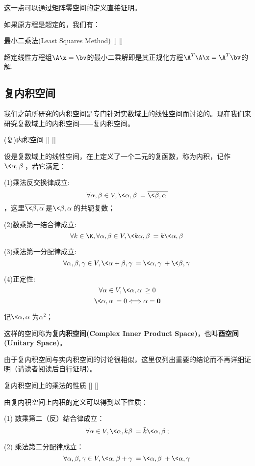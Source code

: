\documentclass[UTF8]{ctexart}
\begin{document}
		\begin{prf}
			这一点可以通过矩阵零空间的定义直接证明。
		\end{prf}
		
		如果原方程是超定的，我们有：
				
		\begin{thm}
			[]
			{最小二乘法(Least Squares Method)}
			[]
			[]
			
			超定线性方程组$\A\x=\bv$的最小二乘解即是其正规化方程$\A^T\A\x=\A^T\bv$的解. 
		\end{thm}

	\subsection{复内积空间}

		我们之前所研究的内积空间是专门针对实数域上的线性空间而讨论的。现在我们来研究复数域上的内积空间——复内积空间。

		\begin{dfn}
			[]
			{(复)内积空间}
			[]
			[]

			设是复数域上的线性空间，在上定义了一个二元的复函数，称为内积，记作$\<\alpha,\beta\>$，若它满足：

			(1)乘法反交换律成立: 
			\[\forall\alpha,\beta\in V, \<\alpha,\beta\>=\overline{\<\beta,\alpha\>} \]，这里\(\overline{\<\beta,\alpha\>}\)是\(\<\beta,\alpha\>\)的共轭复数；
			
			(2)数乘第一结合律成立: 
			\[\forall k\in\K, \forall \alpha,\beta\in V, \<k\alpha,\beta\>=k\<\alpha,\beta\>\]
			
			(3)乘法第一分配律成立: 
			\[\forall\alpha,\beta,\gamma\in V, \<\alpha+\beta,\gamma\>=\<\alpha,\gamma\>+\<\beta,\gamma\>\]
			
			(4)正定性: 
			\[\forall \alpha\in V, \<\alpha,\alpha\>\geq 0\]
			\[\<\alpha,\alpha\>=0\Longleftrightarrow \alpha=\mathbf{0}\]
			
			记$\<\alpha,\alpha\>$为$\alpha^2$； 

			这样的空间称为\textbf{复内积空间(Complex Inner Product Space)}，也叫\textbf{酉空间(Unitary Space)}。
		\end{dfn}

		由于复内积空间与实内积空间的讨论很相似，这里仅列出重要的结论而不再详细证明（请读者阅读后自行证明）。

		\begin{ppt}
			[]
			{复内积空间上的乘法的性质}
			[]
			[]

			由复内积空间上内积的定义可以得到以下性质：

			(1) 数乘第二（反）结合律成立：\[\forall \alpha\in V,\<\alpha,k\beta\>=\bar{k}\<\alpha,\beta\>;\]

			(2) 乘法第二分配律成立：\[\forall\alpha,\beta,\gamma\in V, \<\alpha,\beta+\gamma\>=\<\alpha,\beta\>+\<\alpha,\gamma\>\]
		\end{ppt}
\end{document}
